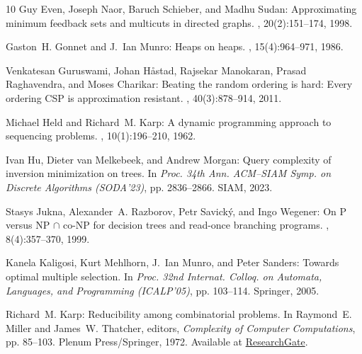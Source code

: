 \documentclass[11pt]{article}
\numberwithin{equation}{section}
\theoremstyle{definition}
\theoremstyle{plain}
\begin{document}
\begin{thebibliography}{10}
{\sc Guy Even, Joseph Naor, Baruch Schieber, and Madhu Sudan}: Approximating
  minimum feedback sets and multicuts in directed graphs.
, 20(2):151--174, 1998.
\newblock [\epfmtdoi{10.1007/pl00009191}]

{\sc Gaston~H. Gonnet and J.~Ian Munro}: Heaps on heaps.
, 15(4):964--971, 1986.
\newblock [\epfmtdoi{10.1137/0215068}]

{\sc Venkatesan Guruswami, Johan H{\aa}stad, Rajsekar Manokaran, Prasad
  Raghavendra, and Moses Charikar}: Beating the random ordering is hard:
  {E}very ordering {CSP} is approximation resistant.
, 40(3):878--914, 2011.
\newblock [\epfmtdoi{10.1137/090756144}]

{\sc Michael Held and Richard~M. Karp}: A dynamic programming approach to
  sequencing problems.
, 10(1):196--210, 1962.
\newblock [\epfmtdoi{10.1137/0110015}]

{\sc Ivan Hu, Dieter van Melkebeek, and Andrew Morgan}: Query complexity of
  inversion minimization on trees.
\newblock In {\em Proc. 34th Ann. ACM--SIAM Symp. on Discrete Algorithms
  (SODA'23)}, pp. 2836--2866. SIAM, 2023.
\newblock [\epfmtdoi{10.1137/1.9781611977554.ch107}]

{\sc Stasys Jukna, Alexander~A. Razborov, Petr Savick{\'{y}}, and Ingo
  Wegener}: On {P} versus {NP} $\cap$ co-{NP} for decision trees and read-once
  branching programs.
, 8(4):357--370, 1999.
\newblock [\epfmtdoi{10.1007/s000370050005}]

{\sc Kanela Kaligosi, Kurt Mehlhorn, J.~Ian Munro, and Peter Sanders}: Towards
  optimal multiple selection.
\newblock In {\em Proc. 32nd Internat. Colloq. on Automata, Languages, and
  Programming (ICALP'05)}, pp. 103--114. Springer, 2005.
\newblock [\epfmtdoi{10.1007/11523468\_9}]

{\sc Richard~M. Karp}: Reducibility among combinatorial problems.
\newblock In {\sc Raymond~E. Miller and James~W. Thatcher}, editors, {\em
  Complexity of Computer Computations}, pp. 85--103. Plenum Press/Springer,
  1972.
\newblock Available at
  \href{https://www.researchgate.net/publication/221580898_Reducibility_Among_Combinatorial_Problems}{ResearchGate}.
\newblock [\epfmtdoi{10.1007/978-1-4684-2001-2\_9}]


\end{thebibliography}
\end{document}
